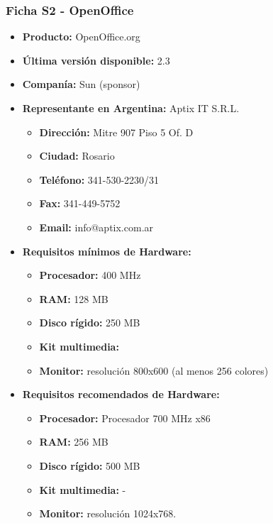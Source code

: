 \subsubsection{Ficha S2 - OpenOffice}

\begin{itemize}
  \item \textbf{Producto:} OpenOffice.org
  \item \textbf{Última versión disponible:} 2.3
  \item \textbf{Companía:} Sun (sponsor)

  \item \textbf{Representante en Argentina:} Aptix IT S.R.L.
    \begin{itemize}
      \item \textbf{Dirección:} Mitre 907 Piso 5 Of. D
      \item \textbf{Ciudad:} Rosario
      \item \textbf{Teléfono:} 341-530-2230/31
      \item \textbf{Fax:} 341-449-5752
      \item \textbf{Email:} info@aptix.com.ar
    \end{itemize}

  \item \textbf{Requisitos mínimos de Hardware:}
    \begin{itemize}
      \item \textbf{Procesador:} 400 MHz
      \item \textbf{RAM:} 128 MB
      \item \textbf{Disco rígido:} 250 MB
      \item \textbf{Kit multimedia:}
      \item \textbf{Monitor:} resolución 800x600 (al menos 256 colores)
    \end{itemize}

  \item \textbf{Requisitos recomendados de Hardware:}
    \begin{itemize}
      \item \textbf{Procesador:} Procesador 700 MHz x86
      \item \textbf{RAM:} 256 MB
      \item \textbf{Disco rígido:} 500 MB
      \item \textbf{Kit multimedia:} -
      \item \textbf{Monitor:} resolución 1024x768.
    \end{itemize}


\end{itemize}
